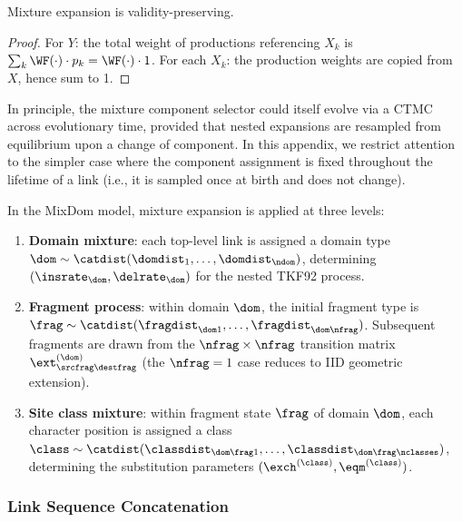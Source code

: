 \begin{proposition}
Mixture expansion is validity-preserving.
\end{proposition}

\begin{proof}
For $Y$: the total weight of productions referencing $X_k$ is
$\sum_k \WF(\cdot) \cdot p_k = \WF(\cdot) \cdot 1$.
For each $X_k$: the production weights are copied from $X$, hence sum to 1.
\end{proof}

\begin{remark}
In principle, the mixture component selector could itself evolve
via a CTMC across evolutionary time, provided that nested expansions
are resampled from equilibrium upon a change of component.
In this appendix, we restrict attention to the simpler case where
the component assignment is fixed throughout the lifetime of a link
(i.e., it is sampled once at birth and does not change).
\end{remark}

\begin{example}
In the MixDom model, mixture expansion is applied at three levels:
\begin{enumerate}
\item \textbf{Domain mixture}: each top-level link is assigned a
  domain type $\dom \sim \catdist(\domdist_1,\ldots,\domdist_\ndom)$, determining
  $(\insrate_\dom, \delrate_\dom)$ for the nested TKF92 process.
\item \textbf{Fragment process}: within domain $\dom$, the initial
  fragment type is $\frag \sim \catdist(\fragdist_{\dom 1},\ldots,\fragdist_{\dom\nfrag})$.
  Subsequent fragments are drawn
  from the $\nfrag \times \nfrag$ transition matrix $\ext^{(\dom)}_{\srcfrag\destfrag}$
  (the $\nfrag = 1$ case reduces to IID geometric extension).
\item \textbf{Site class mixture}: within fragment state $\frag$ of domain $\dom$,
  each character position is assigned a class $\class \sim \catdist(\classdist_{\dom\frag 1},\ldots,\classdist_{\dom\frag\nclasses})$,
  determining the substitution parameters $(\exch^{(\class)}, \eqm^{(\class)})$.
\end{enumerate}
\end{example}

\subsubsection{Link Sequence Concatenation}
\label{sec:concatenation-appendix}

